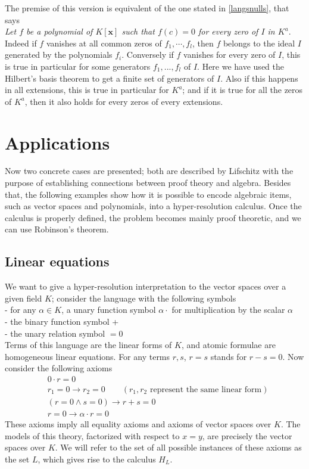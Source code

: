 \documentclass[a4paper,12pt,oneside]{book}
\let\e\wedge
\begin{document}
\noindent The premise of this version is equivalent of the one stated in \ref{langsnulls}, that says\\ \textit{Let $f$ be a polynomial of $K[\mathbf{x}]$ such that $f(c)=0$ for every zero of $I$ in $K^a$}.
 Indeed if $f$ vanishes at all common zeros of $f_1,\cdots, f_l$, then $f$ belongs to the ideal $I$ generated by the polynomials  $f_i$. Conversely if $f$ vanishes for every zero of $I$, this is true in particular for some generators $f_1,...,f_l$ of $I$. Here we have used the Hilbert's basis theorem to get a finite set of generators of $I$. Also if this happens in all extensions, this is true in particular for $K^a$; and if it is true for all the zeros of $K^a$, then it also holds for every zeros of every extensions.

\newpage
\section{Applications}
Now two concrete cases are presented; both are described by Lifschitz \cite{lifschitz} with the purpose of establishing connections between proof theory and algebra. Besides that, the following examples show how it is possible to encode algebraic items, such as vector spaces and polynomials, into a hyper-resolution calculus. Once the calculus is properly defined, the problem becomes mainly proof theoretic, and we can use Robinson's theorem.


\subsection*{Linear equations}
 
We want to give a hyper-resolution interpretation to the vector spaces over a given field $K$; consider the language with the following symbols\\
- for any $\alpha\in K$, a unary function symbol $\alpha\cdot$ for multiplication by the scalar $\alpha$\\
-  the binary function symbol +\\
- the unary relation symbol $=0$\\
Terms of this language are the linear forms of $K$, and atomic formulae are homo\-geneous linear equations. For any terms $r,s$, $r=s$ stands for $r-s=0$. Now consider the following axioms
\begin{eqnarray}
&0\cdot r =0 \\ \label{vec.spac1}
&r_1=0\rightarrow r_2 =0  \qquad (r_1,r_2 \text{ represent the same linear form}) \\
& ( r=0 \e s=0 )\rightarrow r+s =0 \\
& r=0 \rightarrow \alpha\cdot r =0 \label{vec.spac.ultimo}
\end{eqnarray}
These axioms imply all equality axioms and axioms of vector spaces over $K$. The models of this theory, factorized with respect to $x=y$, are precisely the vector spaces over $K$.
We will refer to the set of all possible instances of these axioms as the set $L$, which gives rise to the calculus $H_L$. 
\end{document}
